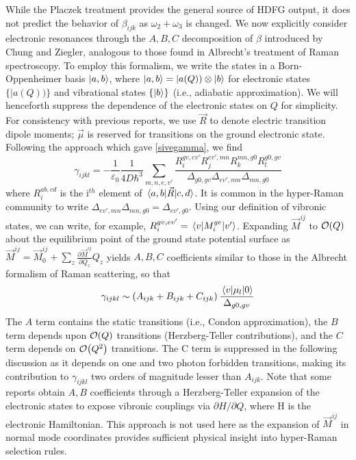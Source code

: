 \documentclass[aip, jcp, reprint, onecolumn]{revtex4-2}
\begin{document}
While the Placzek treatment provides the general source of HDFG output, it does not predict the behavior of $\beta_{ijk}$ as $\omega_2 + \omega_3$ is changed.
We now explicitly consider electronic resonances through the $A,B,C$ decomposition of $\beta$ introduced by Chung and Ziegler, analogous to those found in Albrecht's treatment of Raman spectroscopy.\cite{Albrecht1961, Ziegler1988} 
To employ this formalism, we write the states in a Born-Oppenheimer basis $\ket{a,b}$, where $\ket{a,b} = |a(Q)) \otimes \ket{b}$ for electronic states $\{|a(Q))\}$ and vibrational states $\{\ket{b}\}$ (i.e., adiabatic approximation). \cite{BornOppenheimer, Tang1970}
We will henceforth suppress the dependence of the electronic states on $Q$ for simplicity.
For consistency with previous reports, we use $\vec{R}$ to denote electric transition dipole moments; $\vec{\mu}$ is reserved for transitions on the ground electronic state. \cite{Tang1970}
Following the approach which gave \autoref{sivegamma}, we find
\begin{equation}\label{drgamma_notaylor}
	\gamma_{ijkl} = -\frac{1}{\varepsilon_0} \frac{1}{4D \hbar^3} \sum_{m,n,e,v'} \frac{
		R_{i}^{gv, ev'} 
		R_{j}^{ev',mn} 
		R_{k}^{mn,g0} 
		R_{l}^{g0,gv} 
	}{\Delta_{g0,gv}
		\Delta_{ev', mn}
		\Delta_{mn, g0}
	}
\end{equation}
where $R_{i}^{ab,cd}$ is the i$^{th}$ element of $\mel{a,b}{\vec{R}}{c,d}$.
It is common in the hyper-Raman community to write $\Delta_{ev', mn} \Delta_{mn, g0} = \Delta_{ev', g0}$.
Using our definition of vibronic states, we can write, for example,
$R_{i}^{gv,ev'} = \mel{v}{M_i^{ge}}{v'}$.
Expanding $\vec{M}^{ij}$ to $\order{Q}$ about the equilibrium point of the ground state potential surface as
$\vec{M}^{ij} = \vec{M}^{ij}_0 + \sum_z \frac{\partial\vec{M}^{ij}}{\partial Q_z} Q_z$
yields $A, B, C$ coefficients similar to those in the Albrecht formalism of Raman scattering, \cite{Albrecht1961, Ziegler1988} so that
\begin{equation}
		\gamma_{ijkl} \sim \left(A_{ijk} + B_{ijk} + C_{ijk}\right) \frac{\mel{v}{\mu_{l}}{0}} {\Delta_{g0,gv}}
\end{equation}
The $A$ term contains the static transitions (i.e., Condon approximation), the $B$ term depends upon $\order{Q}$ transitions (Herzberg-Teller contributions), and the $C$ term depends on $\order{Q^2}$ transitions. 
The C term is suppressed in the following discussion as it depends on one and two photon forbidden transitions, making its contribution to $\gamma_{ijkl}$ two orders of magnitude lesser than $A_{ijk}$. \cite{Ziegler1988, Neddersen1989, Bonang1992}
Note that some reports obtain $A, B$ coefficients through a Herzberg-Teller expansion of the electronic states to expose vibronic couplings via $\partial H / \partial Q$, where H is the electronic Hamiltonian.\cite{HerzbergTeller1933, Petrov1985, Neddersen1989, Baranov1990}
This approach is not used here as the expansion of $\vec{M}^{ij}$ in normal mode coordinates provides sufficient physical insight into hyper-Raman selection rules. 
\end{document}
